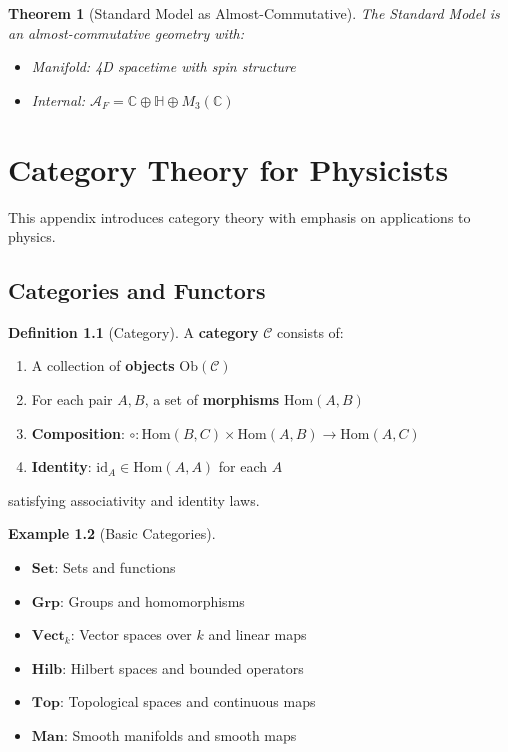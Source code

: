 \documentclass[11pt,a4paper,openright]{book}
\theoremstyle{plain}
\newtheorem{theorem}{Theorem}[chapter]
\theoremstyle{definition}
\newtheorem{definition}[theorem]{Definition}
\newtheorem{example}[theorem]{Example}
\newcommand{\A}{\mathcal{A}}
\newcommand{\Hom}{\mathrm{Hom}}
\newcommand{\id}{\mathrm{id}}
\newcommand{\C}{\mathbb{C}}
\newcommand{\Hilb}{\mathbf{Hilb}}
\newcommand{\Set}{\mathbf{Set}}
\begin{document}
\begin{theorem}[Standard Model as Almost-Commutative]
The Standard Model is an almost-commutative geometry with:
\begin{itemize}
    \item Manifold: 4D spacetime with spin structure
    \item Internal: $\A_F = \C \oplus \mathbb{H} \oplus M_3(\C)$
\end{itemize}
\end{theorem}


\chapter{Category Theory for Physicists}
\label{app:category}

This appendix introduces category theory with emphasis on applications to physics.

\section{Categories and Functors}

\begin{definition}[Category]
A \textbf{category} $\mathcal{C}$ consists of:
\begin{enumerate}[label=(\roman*)]
    \item A collection of \textbf{objects} $\mathrm{Ob}(\mathcal{C})$
    \item For each pair $A, B$, a set of \textbf{morphisms} $\Hom(A, B)$
    \item \textbf{Composition}: $\circ: \Hom(B,C) \times \Hom(A,B) \to \Hom(A,C)$
    \item \textbf{Identity}: $\id_A \in \Hom(A, A)$ for each $A$
\end{enumerate}
satisfying associativity and identity laws.
\end{definition}

\begin{example}[Basic Categories]
\begin{itemize}
    \item $\Set$: Sets and functions
    \item $\mathbf{Grp}$: Groups and homomorphisms
    \item $\mathbf{Vect}_k$: Vector spaces over $k$ and linear maps
    \item $\Hilb$: Hilbert spaces and bounded operators
    \item $\mathbf{Top}$: Topological spaces and continuous maps
    \item $\mathbf{Man}$: Smooth manifolds and smooth maps
\end{itemize}
\end{example}
\end{document}
